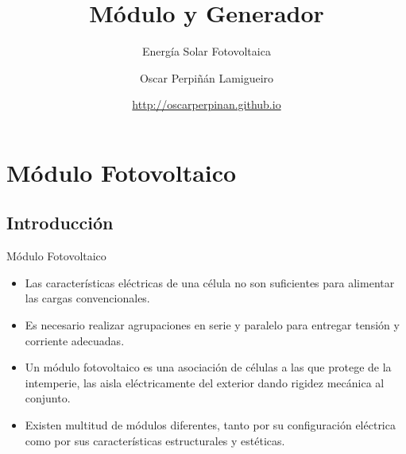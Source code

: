 \documentclass[xcolor={usenames,svgnames,dvipsnames}]{beamer}
\author{Oscar Perpiñán Lamigueiro}
\date{\url{http://oscarperpinan.github.io}}
\title{Módulo y Generador}
\subtitle{Energía Solar Fotovoltaica}
\begin{document}
\maketitle

\section{Módulo Fotovoltaico}
\label{sec:org3b19948}

\subsection{Introducción}
\label{sec:org554e9b7}

\begin{frame}[label={sec:orga4213b2}]{Módulo Fotovoltaico}
\begin{itemize}[<+->]
\item Las características eléctricas de una célula no son suficientes para alimentar las cargas convencionales.

\item Es necesario realizar \alert{agrupaciones en serie y paralelo para entregar tensión y corriente adecuadas}.

\item Un \alert{módulo fotovoltaico} es una \alert{asociación de células} a las que \alert{protege de la intemperie}, las \alert{aisla eléctricamente} del exterior dando \alert{rigidez mecánica} al conjunto.

\item Existen multitud de módulos diferentes, tanto por su configuración eléctrica como por sus características estructurales y estéticas.
\end{itemize}
\end{frame}
\end{document}
